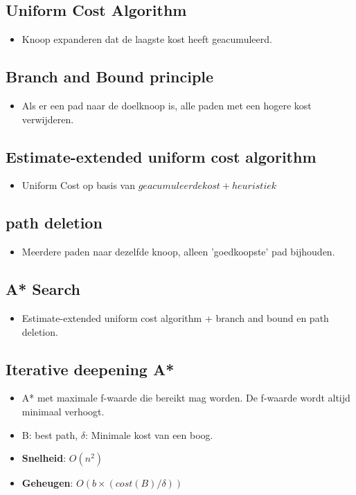 \documentclass{report}
\begin{document}
    \subsection{Uniform Cost Algorithm}
      \begin{itemize}
        \item Knoop expanderen dat de laagste kost heeft geacumuleerd.
      \end{itemize}
    \subsection{Branch and Bound principle}
      \begin{itemize}
        \item Als er een pad naar de doelknoop is, alle paden met een hogere kost verwijderen.
      \end{itemize}
    \subsection{Estimate-extended uniform cost algorithm}
      \begin{itemize}
        \item Uniform Cost op basis van $geacumuleerde kost + heuristiek$
      \end{itemize}
    \subsection{path deletion}
      \begin{itemize}
        \item Meerdere paden naar dezelfde knoop, alleen 'goedkoopste' pad bijhouden.
      \end{itemize}
    \subsection{A* Search}
      \begin{itemize}
        \item Estimate-extended uniform cost algorithm + branch and bound en path deletion.
      \end{itemize}
    \subsection{Iterative deepening A*}
      \begin{itemize}
        \item A* met maximale f-waarde die bereikt mag worden. De f-waarde wordt altijd minimaal verhoogt.
        \item B: best path, $\delta$: Minimale kost van een boog.
        \item \textbf{Snelheid}: $O(n^2)$
        \item \textbf{Geheugen}: $O(b \times (cost(B)/\delta))$
      \end{itemize}
\end{document}

